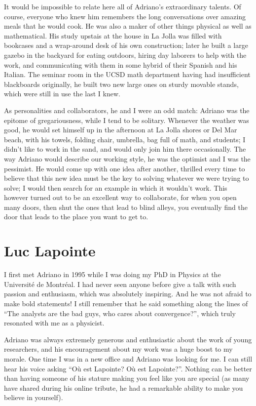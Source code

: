 \documentclass{notices}
\begin{document}
It would be impossible to relate here all of Adriano's extraordinary talents.  Of course, everyone who knew him remembers the long conversations over amazing meals that he would cook.  He was also a maker of other things physical as well as mathematical.  His study upstais at the house in La Jolla was filled with bookcases and a wrap-around desk of his own construction; later he built a large gazebo in the backyard for eating outdoors, hiring day laborers to help with the work, and communicating with them in some hybrid of their Spanish and his Italian.  The seminar room in the UCSD math department having had insufficient blackboards originally, he built two new large ones on sturdy movable stands, which were still in use the last I knew.

As personalities and collaborators, he and I were an odd match: Adriano was the epitome of gregariousness, while I tend to be solitary.  Whenever the weather was good, he would set himself up in the afternoon at La Jolla shores or Del Mar beach, with his towels, folding chair, umbrella, bag full of math, and students; I didn't like to work in the sand, and would only join him there occasionally.  The way Adriano would describe our working style, he was the optimist and I was the pessimist.  He would come up with one idea after another, thrilled every time to believe that this new idea must be the key to solving whatever we were trying to solve; I would then search for an example in which it wouldn't work.  This however turned out to be an excellent way to collaborate, for when you open many doors, then shut the ones that lead to blind alleys, you eventually find the door that leads to the place you want to get to.

\section*{Luc Lapointe}
I first met Adriano in 1995 while I was doing my PhD in Physics at the Université de Montréal.
I had never seen anyone before give a talk with such passion and enthusiasm, which was absolutely inspiring.
And he was not afraid to make bold statements! I still remember that he said something along the lines of ``The analysts are the bad guys, who cares about convergence?'', which truly resonated with me as a physicist.

Adriano was always extremely generous and enthusiastic about the work of young researchers, and his encouragement about my work was a huge boost to my morale. One time I was in a new office and Adriano was looking for me.  I can still hear his voice asking ``Où est Lapointe? Où est Lapointe?''.  Nothing can be better than having someone of his stature making you feel like you are special  (as many have shared during his online tribute, he had a remarkable ability to make you believe in yourself).
\end{document}

